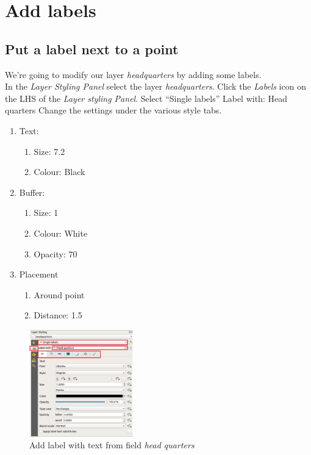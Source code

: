 
\chapter{Add labels}

\pagestyle{fancy}
\fancyhf{}
\fancyhead[OC]{\leftmark}
\fancyhead[EC]{\rightmark}
\cfoot{\thepage}
\label{chap:labels}


\section{Put a label next to a point}

We're going to modify our layer \textit{headquarters} by adding some labels.\\
In the \textit{Layer Styling Panel} select the layer  \textit{headquarters}.
Click the \textit{Labels} icon on the LHS of the  \textit{Layer styling Panel}.
Select “Single labels”
Label with: Head quarters
Change the settings under the various style tabs.
\begin{enumerate}[~~~1)]
	\item
	Text:
	\begin{enumerate}[~~~1)]
		\item
		Size: 7.2
		\item
		Colour: Black
	\end{enumerate}

	\item
	Buffer: 
	\begin{enumerate}[~~~1)]
		\item
		Size: 1
		\item
		Colour: White
		\item
		Opacity: 70%
	\end{enumerate}

	\item
	Placement
	\begin{enumerate}[~~~1)]
		\item
		Around point
		\item
		Distance: 1.5
	\end{enumerate}
\end{enumerate}

\begin{figure}[!h]
	\centering
	\includegraphics[width=0.4\textwidth]{images/point_label.png}
	\caption{Add label with text from field \textit{head quarters}}
	\label{ft_fig_firstfig3}
\end{figure}

